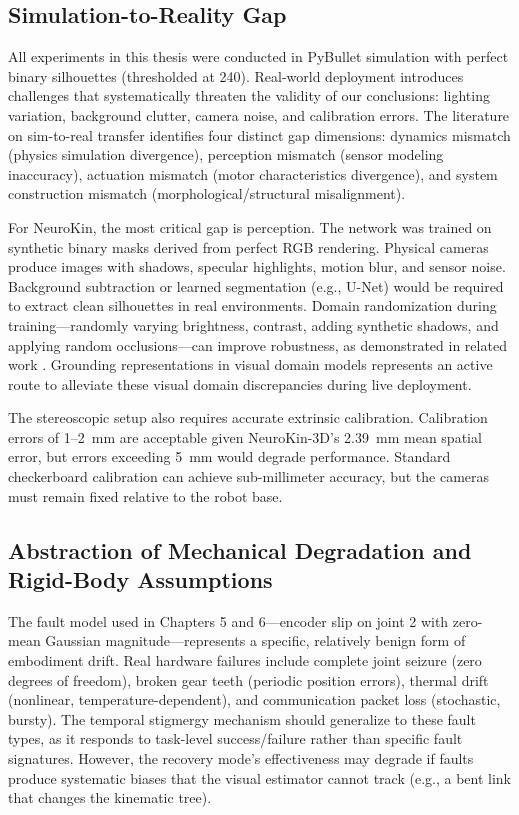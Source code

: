 \documentclass[12pt,a4paper,oneside]{report}
\begin{document}
\subsection{Simulation-to-Reality Gap}
All experiments in this thesis were conducted in PyBullet simulation with perfect binary silhouettes (thresholded at 240). Real-world deployment introduces challenges that systematically threaten the validity of our conclusions: lighting variation, background clutter, camera noise, and calibration errors. The literature on sim-to-real transfer \cite{tan2018simtoreal, aljalbout2026realitygap} identifies four distinct gap dimensions: dynamics mismatch (physics simulation divergence), perception mismatch (sensor modeling inaccuracy), actuation mismatch (motor characteristics divergence), and system construction mismatch (morphological/structural misalignment).

For NeuroKin, the most critical gap is perception. The network was trained on synthetic binary masks derived from perfect RGB rendering. Physical cameras produce images with shadows, specular highlights, motion blur, and sensor noise. Background subtraction or learned segmentation (e.g., U-Net) would be required to extract clean silhouettes in real environments. Domain randomization during training---randomly varying brightness, contrast, adding synthetic shadows, and applying random occlusions---can improve robustness, as demonstrated in related work \cite{rezvani2024robust, qiu2024swim2real}. Grounding representations in visual domain models \cite{qureshi2025splatsim, tang2025semantic} represents an active route to alleviate these visual domain discrepancies during live deployment.

The stereoscopic setup also requires accurate extrinsic calibration. Calibration errors of 1--2~mm are acceptable given NeuroKin-3D's 2.39~mm mean spatial error, but errors exceeding 5~mm would degrade performance. Standard checkerboard calibration can achieve sub-millimeter accuracy, but the cameras must remain fixed relative to the robot base.

\subsection{Abstraction of Mechanical Degradation and Rigid-Body Assumptions}
The fault model used in Chapters 5 and 6---encoder slip on joint 2 with zero-mean Gaussian magnitude---represents a specific, relatively benign form of embodiment drift. Real hardware failures include complete joint seizure (zero degrees of freedom), broken gear teeth (periodic position errors), thermal drift (nonlinear, temperature-dependent), and communication packet loss (stochastic, bursty). The temporal stigmergy mechanism should generalize to these fault types, as it responds to task-level success/failure rather than specific fault signatures. However, the recovery mode's effectiveness may degrade if faults produce systematic biases that the visual estimator cannot track (e.g., a bent link that changes the kinematic tree).
\end{document}
